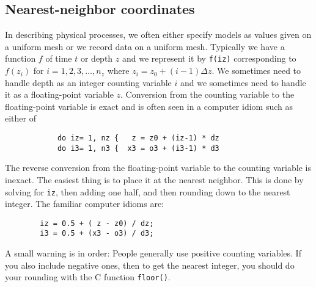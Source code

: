 \subsection{Nearest-neighbor coordinates}
In describing physical processes,
we often either specify models as values given on a uniform mesh
or we record data on a uniform mesh.
Typically we have
a function $f$ of time $t$ or depth $z$
and we represent it by {\tt f(iz)}
corresponding to $f(z_i)$ for $i=1,2,3,\ldots, n_z$
where $z_i = z_0+ (i-1)\Delta z$.
We sometimes need to handle depth as
an integer counting variable $i$
and we sometimes need to handle it as
a floating-point variable $z$.
Conversion from the counting variable to the floating-point variable
is exact and is often seen in a computer idiom
such as either of \begin{verbatim}
            do iz= 1, nz {   z = z0 + (iz-1) * dz 
            do i3= 1, n3 {  x3 = o3 + (i3-1) * d3
\end{verbatim}
The reverse conversion from the floating-point variable
to the counting variable is inexact.
The easiest thing is to place it at the nearest neighbor.
This is done by solving for {\tt iz}, then adding one half,
and then rounding down to the nearest integer.
The familiar computer idioms are:\begin{verbatim}
        iz = 0.5 + ( z - z0) / dz;
        i3 = 0.5 + (x3 - o3) / d3;
\end{verbatim}
A small warning is in order:
People generally use positive counting variables.
If you also include negative ones,
then to get the nearest integer,
you should do your rounding with the C function {\tt floor()}.

